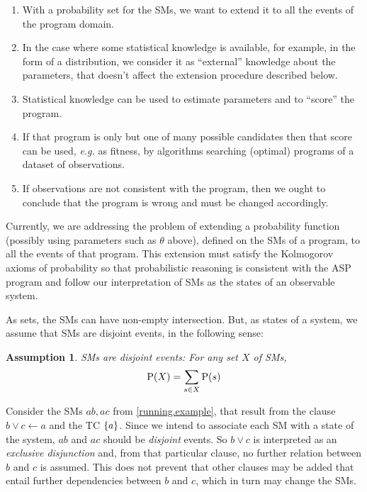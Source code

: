 \documentclass[adraft,copyright,creativecommons]{eptcs}
\newtheorem{assumption}{Assumption}
\newcommand{\at}[1]{\ensuremath{\!\del{#1}}}
\newcommand{\pr}[1]{\ensuremath{\mathrm{P}\at{#1}}}
\begin{document}
\begin{enumerate}

    \item With a probability set for the \aclp{SM}, we want to extend it to all the events of the program domain.

    \item In the case where some statistical knowledge is available, for example, in the form of a distribution, we consider it as ``external'' knowledge about the parameters, that doesn't affect the extension procedure described below.

    \item Statistical knowledge can be used to estimate parameters and to ``score'' the program.

    \item\label{item:program.selection} If that program is only but one of many possible candidates then that score can be used, \emph{e.g.} as fitness, by algorithms searching (optimal) programs of a dataset of observations.

    \item  If observations are not consistent with the program, then we ought to conclude that the program is wrong and must be changed accordingly.
\end{enumerate}

Currently, we are addressing the problem of extending a probability function (possibly using parameters such as $\theta$ above), defined on the \acp{SM} of a program, to all the events of that program. This extension must satisfy the Kolmogorov axioms of probability so that probabilistic reasoning is consistent with the \ac{ASP} program and follow our interpretation of \aclp{SM} as the states of an observable system.

As sets, the \acp{SM} can have non-empty intersection. But, as states of a system, we assume that \acp{SM} are disjoint events, in the following sense:

\begin{assumption}\label{assumption:smodels.disjoint}
    \Aclp{SM} are disjoint events: For any set $X$ of \aclp{SM},
    \begin{equation}
        \pr{X} = \sum_{s\in X}\pr{s}
    \end{equation}
\end{assumption}

Consider the \aclp{SM} $ab, ac$ from \cref{running.example}, that result from the clause $b \vee c \leftarrow a$ and the \acl{TC} $\set{a}$. Since we intend to associate each \acl{SM} with a state of the system, $ab$ and $ac$ should be \emph{disjoint} events. So $b \vee c$ is interpreted as an \emph{exclusive disjunction} and, from that particular clause, no further relation between $b$ and $c$ is assumed. This does not prevent that other clauses may be added that entail further dependencies between $b$ and $c$, which in turn may change the \aclp{SM}.
\end{document}
